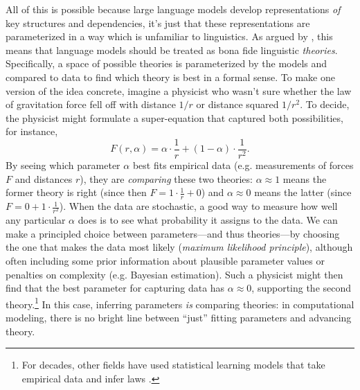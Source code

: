 \documentclass[output=paper,colorlinks,citecolor=brown
]{langscibook}
\begin{document}
 
All of this is possible because large language models develop representations \emph{of} key structures and dependencies, it's just that these representations are parameterized in a way which is unfamiliar to linguistics. As argued by \cite{baroni2022proper}, this means that language models should be treated as bona fide linguistic \emph{theories}. Specifically, a space of possible theories is parameterized by the models and compared to data to find which theory is best in a formal sense. To make one version of the idea concrete, imagine a physicist who wasn't sure whether the law of gravitation force fell off with distance $1/r$ or distance squared $1/r^2$. To decide, the physicist might formulate a super-equation that captured both possibilities, for instance,
$$
F(r,\alpha) = \alpha \cdot \frac{1}{r} + (1-\alpha) \cdot \frac{1}{r^2}.
$$
By seeing which parameter $\alpha$ best fits empirical data (e.g. measurements of forces $F$ and distances $r$), they are \emph{comparing} these two theories: $\alpha\approx 1$ means the former theory is right (since then $F=1\cdot\frac{1}{r}+0$) and $\alpha \approx 0$ means the latter (since $F=0+1\cdot\frac{1}{r^2}$). When the data are stochastic, a good way to measure how well any particular $\alpha$ does is to see what probability it assigns to the data. We can make a principled choice between parameters---and thus theories---by choosing the one that makes the data most likely (\emph{maximum likelihood principle}), although often including some prior information about plausible parameter values or penalties on complexity (e.g. Bayesian estimation). 
Such a physicist might then find that the best parameter for capturing data has $\alpha \approx 0$, supporting the second theory.\footnote{For decades, other fields have used statistical learning models that take empirical data and infer laws \citep{koza1994genetic,langley1983rediscovering,schmidt2009distilling,udrescu2020ai}.} In this case, inferring parameters \emph{is} comparing theories: in computational modeling, there is no bright line between ``just'' fitting parameters and advancing theory.
\end{document}

